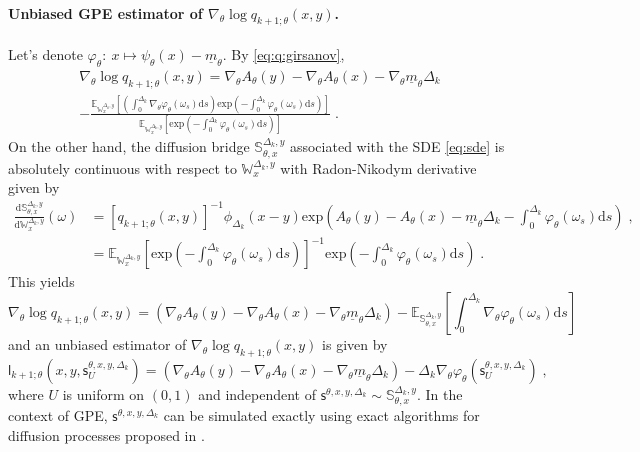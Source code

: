 \documentclass{article}
\newcommand{\gpeLB}{\underline{m}_{\parvec}}
\newcommand{\parvec}{\theta}
\newcommand{\hd}[1]{q_{#1}}
\newcommand{\rmd}{\ensuremath{\mathrm{d}}}
\newcommand{\eqsp}{\;}
\begin{document}
\paragraph{Unbiased GPE estimator of $\nabla_{\parvec}\log\hd{k+1;\parvec}(x,y)$.}
Let's denote $\varphi_{\parvec}:~x \mapsto \psi_{\parvec}(x) - \gpeLB$. 
By \eqref{eq:q:girsanov},
\begin{multline*}
\nabla_{\parvec}\log\hd{k+1;\parvec}(x,y) = \nabla_{\parvec}A_{\parvec}(y) - \nabla_{\parvec}A_{\parvec}(x) - \nabla_{\parvec}\gpeLB \Delta_k\\
-\frac{\mathbb{E}_{\mathbb{W}_x^{\Delta_k,y}}\left[\left(\int_0^{\Delta_k} \nabla_{\parvec}\varphi_{\parvec}(\omega_s)\rmd s\right)\mathrm{exp}\left(-\int_0^{\Delta_k} \varphi_{\parvec}(\omega_s)\rmd s\right)\right]}{\mathbb{E}_{\mathbb{W}_x^{\Delta_k,y}}\left[\mathrm{exp}\left(-\int_0^{\Delta_k} \varphi_{\parvec}(\omega_s)\rmd s\right)\right]}\eqsp.
\end{multline*}
 On the other hand, the diffusion bridge $\mathbb{S}^{\Delta_k,y}_{\parvec,x}$ associated with the SDE \eqref{eq:sde} is absolutely continuous with respect to $\mathbb{W}_x^{\Delta_k,y}$ with Radon-Nikodym derivative given by
\begin{align*}
\frac{\rmd \mathbb{S}^{\Delta_k,y}_{\parvec,x}}{\rmd \mathbb{W}_x^{\Delta_k,y}}(\omega) &= \left[\hd{k+1;\parvec}(x,y)\right]^{-1}\phi_{\Delta_k}(x-y)\mathrm{exp}\left(A_{\parvec}(y) - A_{\parvec}(x) - \gpeLB\Delta_k-\int_0^{\Delta_k} \varphi_{\parvec}(\omega_s)\rmd s\right)\eqsp,\\
&=\mathbb{E}_{\mathbb{W}_x^{\Delta_k,y}}\left[\mathrm{exp}\left(-\int_0^{\Delta_k} \varphi_{\parvec}(\omega_s)\rmd s\right)\right]^{-1}\mathrm{exp}\left(-\int_0^{\Delta_k} \varphi_{\parvec}(\omega_s)\rmd s\right)\eqsp.
\end{align*}
This yields
\[
\nabla_{\parvec}\log\hd{k+1;\parvec}(x,y) = \left(\nabla_{\parvec}A_{\parvec}(y) - \nabla_{\parvec}A_{\parvec}(x) - \nabla_{\parvec}\gpeLB\Delta_k\right) - \mathbb{E}_{\mathbb{S}_{\parvec,x}^{\Delta_k,y}} \left[\int_0^{\Delta_k} \nabla_{\parvec}\varphi_{\parvec}(\omega_s)\rmd s\right]
\]
and an unbiased estimator of $\nabla_{\parvec}\log\hd{k+1;\parvec}(x,y)$ is given by
\[
\mathsf{l}_{k+1;\parvec}(x,y,\mathsf{s}^{\parvec,x,y,\Delta_k}_U) = \left(\nabla_{\parvec}A_{\parvec}(y) - \nabla_{\parvec}A_{\parvec}(x) - \nabla_{\parvec}\gpeLB\Delta_k\right) - \Delta_k\nabla_{\parvec}\varphi_{\parvec}(\mathsf{s}^{\parvec,x,y,\Delta_k}_U)\eqsp,
\]
where $U$ is uniform on $(0,1)$ and independent of $\mathsf{s}^{\parvec,x,y,\Delta_k}\sim \mathbb{S}_{\parvec,x}^{\Delta_k,y}$. In the context of GPE, $\mathsf{s}^{\parvec,x,y,\Delta_k}$ can be simulated exactly using exact algorithms for diffusion processes proposed in \cite{beskos2006retrospective}.
\end{document}

